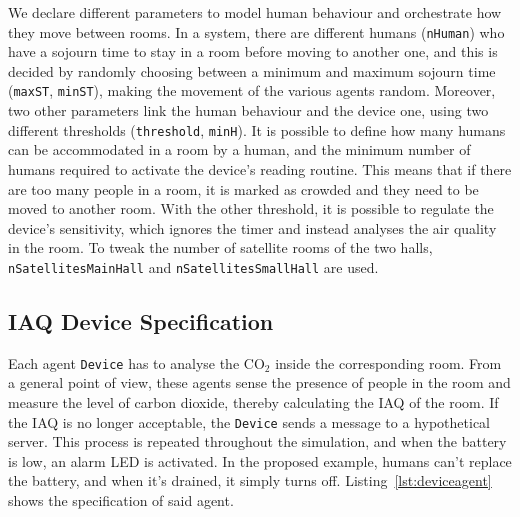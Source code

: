 \documentclass[runningheads]{llncs}
\begin{document}
We declare different parameters to model human behaviour and orchestrate how they move between rooms. In a system, there are different humans (\lstinline{nHuman}) who have a sojourn time to stay in a room before moving to another one, and this is decided by randomly choosing between a minimum and maximum sojourn time (\lstinline{maxST}, \lstinline{minST}), making the movement of the various agents random. 
%
Moreover, two other parameters link the human behaviour and the device one, using two different thresholds (\lstinline{threshold}, \lstinline{minH}). It is possible to define how many humans can be accommodated in a room by a human, and the minimum number of humans required to activate the device's reading routine. This means that if there are too many people in a room, it is marked as crowded and they need to be moved to another room. 
%
With the other threshold, it is possible to regulate the device's sensitivity, which ignores the timer and instead analyses the air quality in the room.
%
To tweak the number of satellite rooms of the two halls, \lstinline{nSatellitesMainHall} and \lstinline{nSatellitesSmallHall} are used.

\subsection{IAQ Device Specification}\label{subsec:iaqspec}

Each agent \lstinline{Device} has to analyse the CO$_2$ inside the corresponding room.
%
From a general point of view, these agents sense the presence of people in the room and measure the level of carbon dioxide, thereby calculating the IAQ of the room.
%
If the IAQ is no longer acceptable, the \lstinline{Device} sends a message to a hypothetical server.
%
This process is repeated throughout the simulation, and when the battery is low, an alarm LED is activated. In the proposed example, humans can't replace the battery, and when it's drained, it simply turns off.
Listing~\ref{lst:deviceagent} shows the specification of said agent.
\end{document}
